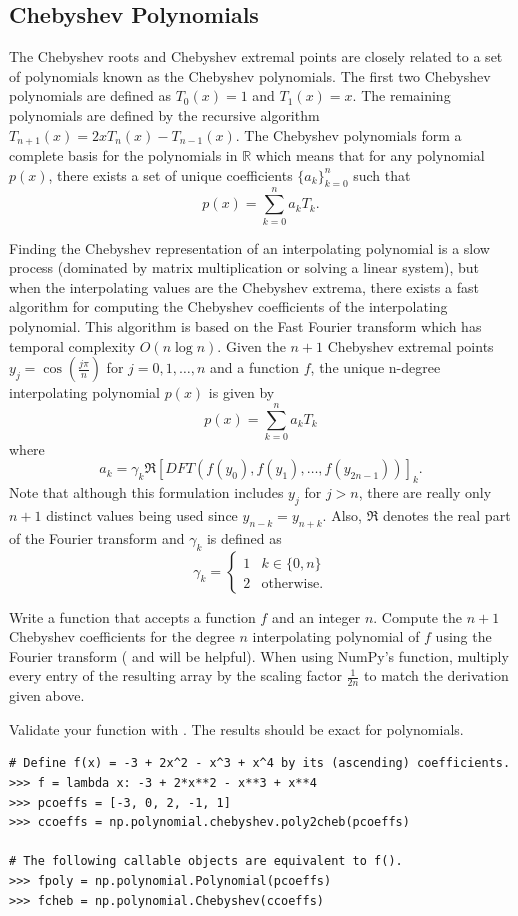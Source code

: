 \subsection*{Chebyshev Polynomials}
The Chebyshev roots and Chebyshev extremal points are closely related to a set of polynomials known as the Chebyshev polynomials.
The first two Chebyshev polynomials are defined as $T_0(x)=1$ and $T_1(x)=x$.
The remaining polynomials are defined by the recursive algorithm $T_{n+1}(x)=2xT_n(x)-T_{n-1}(x)$.
The Chebyshev polynomials form a complete basis for the polynomials in $\mathbb{R}$ which means that for any polynomial $p(x)$,  there exists a set of unique coefficients $\{a_k\}_{k=0}^n$
such that
\[
p(x) = \sum_{k=0}^n a_kT_k.
\]

Finding the Chebyshev representation of an interpolating polynomial is a slow process (dominated by matrix multiplication or solving a linear system), but when the interpolating values are the
Chebyshev extrema, there exists a fast algorithm for computing the Chebyshev coefficients of the interpolating polynomial.
This algorithm is based on the Fast Fourier transform which has temporal complexity $O(n\log n)$.
Given the $n+1$ Chebyshev extremal points $y_j=\cos(\frac{j\pi}{n})$ for $j=0,1,\dots,n$ and a function $f$, the unique n-degree interpolating polynomial $p(x)$ is given by
\[
p(x)=\sum_{k=0}^na_kT_k
\]
where
\[
a_k = \gamma_k \Re \left[ DFT(f(y_0), f(y_1),\dots, f(y_{2n-1}))\right]_k.
\]
Note that although this formulation includes $y_j$ for $j>n$, there are really only $n+1$ distinct values being used since $y_{n-k}=y_{n+k}$.
Also, $\Re$ denotes the real part of the Fourier transform and $\gamma_k$ is defined as
\[
\gamma_k =
\begin{cases}
1 & k\in \{0,n\} \\
2 & \text{otherwise.}
\end{cases}
\]

\begin{problem}
Write a function that accepts a function $f$ and an integer $n$.
Compute the $n+1$ Chebyshev coefficients for the degree $n$ interpolating polynomial of $f$ using the Fourier transform ( and  will be helpful).
When using NumPy's  function, multiply every entry of the resulting array by the scaling factor $\frac{1}{2n}$ to match the derivation given above.

Validate your function with .
The results should be exact for polynomials.
\begin{lstlisting}
# Define f(x) = -3 + 2x^2 - x^3 + x^4 by its (ascending) coefficients.
>>> f = lambda x: -3 + 2*x**2 - x**3 + x**4
>>> pcoeffs = [-3, 0, 2, -1, 1]
>>> ccoeffs = np.polynomial.chebyshev.poly2cheb(pcoeffs)

# The following callable objects are equivalent to f().
>>> fpoly = np.polynomial.Polynomial(pcoeffs)
>>> fcheb = np.polynomial.Chebyshev(ccoeffs)
\end{lstlisting}
\end{problem}

